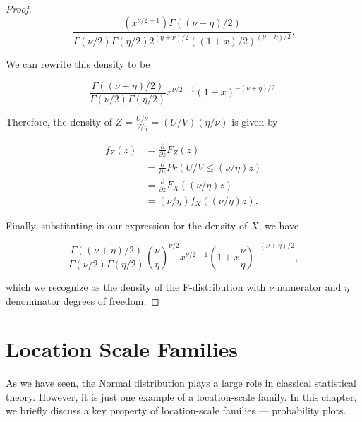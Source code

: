 \documentclass[
  letterpaper,
  DIV=11,
  numbers=noendperiod]{scrreprt}
\theoremstyle{definition}
\theoremstyle{plain}
\theoremstyle{definition}
\theoremstyle{remark}
\begin{document}
\begin{proof}
\[\frac{\left(x^{\nu/2 - 1}\right) \Gamma((\nu+\eta)/2)}{\Gamma(\nu/2)\Gamma(\eta/2) 2^{(\eta + \nu)/2} ((1+x)/2)^{(\nu + \eta)/2}}.\]

We can rewrite this density to be

\[\frac{\Gamma((\nu + \eta)/2)}{\Gamma(\nu/2)\Gamma(\eta/2)} x^{\nu/2 - 1} \left(1 + x\right)^{-(\nu + \eta)/2}.\]

Therefore, the density of \(Z = \frac{U/\nu}{V/\eta} = (U/V)(\eta/\nu)\)
is given by

\[
\begin{aligned}
  f_Z(z)
    &= \frac{\partial}{\partial z} F_Z(z) \\
    &= \frac{\partial}{\partial z} Pr(U/V \leq (\nu/\eta) z) \\
    &= \frac{\partial}{\partial z} F_X((\nu/\eta) z) \\
    &= (\nu/\eta) f_X((\nu/\eta) z).
\end{aligned}
\]

Finally, substituting in our expression for the density of \(X\), we
have

\[\frac{\Gamma((\nu + \eta)/2)}{\Gamma(\nu/2)\Gamma(\eta/2)} \left(\frac{\nu}{\eta}\right)^{\nu/2} x^{\nu/2 - 1} \left(1 + x\frac{\nu}{\eta}\right)^{-(\nu + \eta)/2},\]

which we recognize as the density of the F-distribution with \(\nu\)
numerator and \(\eta\) denominator degrees of freedom.
\end{proof}


\chapter{Location Scale Families}\label{sec-location-scale}

\providecommand{\norm}[1]{\left\lVert#1\right\rVert}
\providecommand{\abs}[1]{\left\lvert#1\right\rvert}
\providecommand{\dist}[1]{\stackrel{\text{#1}}{\sim}}
\providecommand{\ind}[1]{\mathbb{I}\left(#1\right)}
\providecommand{\bm}[1]{\mathbf{#1}}
\providecommand{\bs}[1]{\boldsymbol{#1}}
\providecommand{\Ell}{\mathcal{L}}
\providecommand{\indep}{\perp\negthickspace\negmedspace\perp}

As we have seen, the Normal distribution plays a large role in classical
statistical theory. However, it is just one example of a location-scale
family. In this chapter, we briefly discuss a key property of
location-scale families --- probability plots.
\end{document}

